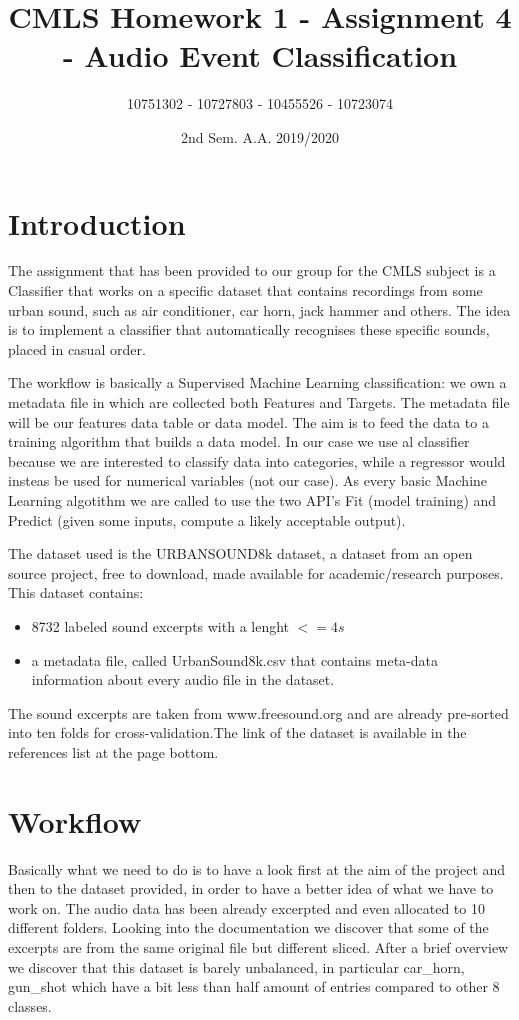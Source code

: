 \documentclass{article}
\title{CMLS Homework 1 - Assignment 4 - Audio Event Classification}
\author{10751302 - 10727803 - 10455526 - 10723074}
\date{2nd Sem. A.A. 2019/2020}
\begin{document}
\maketitle

\section{Introduction}
The assignment that has been provided to our group for the CMLS subject is a Classifier that works on a specific dataset that contains recordings from some urban sound, such as air conditioner, car horn, jack hammer and others. The idea is to implement a classifier that automatically recognises these specific sounds, placed in casual order.

The workflow is basically a Supervised Machine Learning classification: we own a metadata file in which are collected both Features and Targets. The metadata file will be our features data table or data model. The aim is to feed the data to a training algorithm that builds a data model. In our case we use al classifier because we are interested to classify data into categories, while a regressor would insteas be used for numerical variables (not our case).
As every basic Machine Learning algotithm we are called to use the two API's Fit (model training) and Predict (given some inputs, compute a likely acceptable output).

The dataset used is the URBANSOUND8k dataset, a dataset from an open source project, free to download, made available for academic/research purposes. This dataset contains:
\begin{itemize}
  \item 8732 labeled sound excerpts with a lenght $<= 4s$
  \item a metadata file, called UrbanSound8k.csv that contains meta-data information about every audio file in the dataset.
\end{itemize}
The sound excerpts are taken from www.freesound.org and are already pre-sorted into ten folds for cross-validation.The link of the dataset is available in the references list at the page bottom.

\section{Workflow}
Basically what we need to do is to have a look first at the aim of the project and then to the dataset provided, in order to have a better idea of what we have to work on.
The audio data has been already excerpted and even allocated to 10 different folders. Looking into the documentation we discover that some of the excerpts are from the same original file but different sliced.
After a brief overview we discover that this dataset is barely unbalanced, in particular car\_horn, gun\_shot which have a bit less than half amount of entries compared to other 8 classes.
\end{document}
